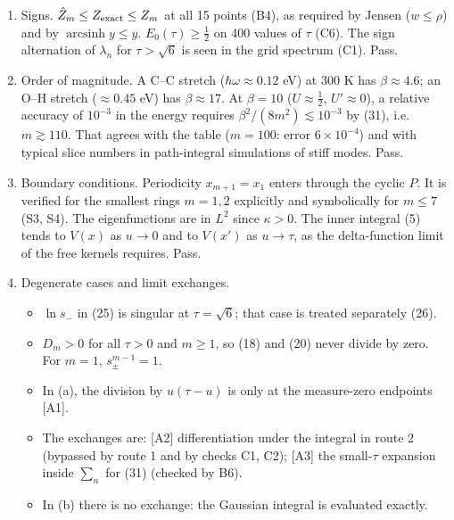 \documentclass[11pt,a4paper]{article}
\providecommand{\tightlist}{\setlength{\itemsep}{0pt}\setlength{\parskip}{0pt}}
\begin{document}
\begin{enumerate}
  \begin{itemize}
  \tightlist
  \item
    \(w(x,x') = w(x',x)\), so \(T_\tau\) is self-adjoint.
  \item
    \(w(-x,-x') = w(x,x')\), so the eigenfunctions have definite parity
    \((-1)^n\), as the \(H_n\) do.
  \item
    \(u\leftrightarrow\tau-u\) with \(x\leftrightarrow x'\) maps
    \(\bar y\to\bar y\) and \(\sigma^2\to\sigma^2\), and (8) is
    symmetric.
  \item
    Ring translation and reflection give \(a_k = a_{m-k}\) in (14).
  \end{itemize}

  Pass.
\item
  Signs. \(\hat Z_m\le Z_{\rm exact}\le Z_m\) at all 15 points (B4), as
  required by Jensen (\(w\le\rho\)) and by
  \(\operatorname{arcsinh}y\le y\). \(E_0(\tau)\ge\tfrac12\) on 400
  values of \(\tau\) (C6). The sign alternation of \(\lambda_n\) for
  \(\tau>\sqrt6\) is seen in the grid spectrum (C1). Pass.
\item
  Order of magnitude. A C--C stretch (\(\hbar\omega\approx0.12\) eV) at
  300 K has \(\beta\approx4.6\); an O--H stretch (\(\approx0.45\) eV)
  has \(\beta\approx17\). At \(\beta=10\) (\(U\approx\tfrac12\),
  \(U'\approx0\)), a relative accuracy of \(10^{-3}\) in the energy
  requires \(\beta^2/(8m^2)\lesssim10^{-3}\) by (31),
  i.e.~\(m\gtrsim110\). That agrees with the table (\(m=100\): error
  \(6\times10^{-4}\)) and with typical slice numbers in path-integral
  simulations of stiff modes. Pass.
\item
  Boundary conditions. Periodicity \(x_{m+1}=x_1\) enters through the
  cyclic \(P\). It is verified for the smallest rings \(m=1,2\)
  explicitly and symbolically for \(m\le7\) (S3, S4). The eigenfunctions
  are in \(L^2\) since \(\kappa>0\). The inner integral (5) tends to
  \(V(x)\) as \(u\to0\) and to \(V(x')\) as \(u\to\tau\), as the
  delta-function limit of the free kernels requires. Pass.
\item
  Degenerate cases and limit exchanges.

  \begin{itemize}
  \tightlist
  \item
    \(\ln s_-\) in (25) is singular at \(\tau=\sqrt6\); that case is
    treated separately (26).
  \item
    \(D_m>0\) for all \(\tau>0\) and \(m\ge1\), so (18) and (20) never
    divide by zero. For \(m=1\), \(s_\pm^{m-1}=1\).
  \item
    In (a), the division by \(u(\tau-u)\) is only at the measure-zero
    endpoints {[}A1{]}.
  \item
    The exchanges are: {[}A2{]} differentiation under the integral in
    route 2 (bypassed by route 1 and by checks C1, C2); {[}A3{]} the
    small-\(\tau\) expansion inside \(\sum_n\) for (31) (checked by B6).
  \item
    In (b) there is no exchange: the Gaussian integral is evaluated
    exactly.
  \end{itemize}


\end{enumerate}
\end{document}
